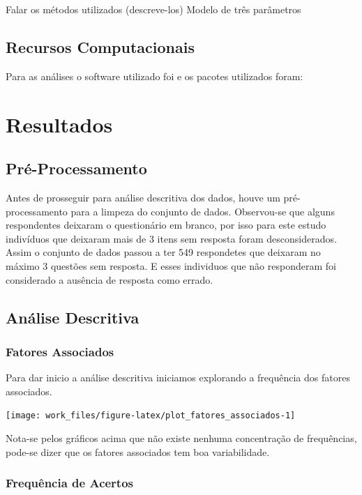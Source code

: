 \documentclass[]{article}
\begin{document}
Falar os métodos utilizados (descreve-los) Modelo de três parâmetros

\subsection{Recursos Computacionais}\label{recursos-computacionais}

Para as análises o software utilizado foi \citet{software-r} e os
pacotes utilizados foram:

\section{Resultados}\label{resultados}

\subsection{Pré-Processamento}\label{pre-processamento}

Antes de prosseguir para análise descritiva dos dados, houve um
pré-processamento para a limpeza do conjunto de dados. Observou-se que
alguns respondentes deixaram o questionário em branco, por isso para
este estudo indivíduos que deixaram mais de 3 itens sem resposta foram
desconsiderados. Assim o conjunto de dados passou a ter 549 respondetes
que deixaram no máximo 3 questões sem resposta. E esses individuos que
não responderam foi considerado a ausência de resposta como errado.

\subsection{Análise Descritiva}\label{analise-descritiva}

\subsubsection{Fatores Associados}\label{fatores-associados}

Para dar inicio a análise descritiva iniciamos explorando a frequência
dos fatores associados.

\begin{center}\texttt{[image: work\_files/figure-latex/plot\_fatores\_associados-1]} \end{center}

Nota-se pelos gráficos acima que não existe nenhuma concentração de
frequências, pode-se dizer que os fatores associados tem boa
variabilidade.

\subsubsection{Frequência de Acertos}\label{frequencia-de-acertos}
\end{document}

